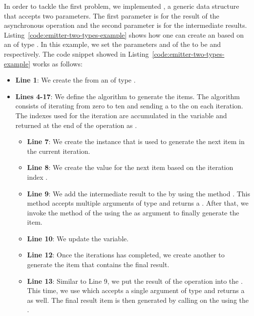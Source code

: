 \documentclass[type=bsc,accentcolor=tud9c]{tudthesis}
\begin{document}
In order to tackle the first problem, we implemented , a generic data structure that accepts two parameters. The first parameter  is for the result of the asynchronous operation and the second parameter  is for the intermediate results. Listing~\ref{code:emitter-two-types-example} shows how one can create an  based on an  of type . In this example, we set the parameters  and  of the  to be  and  respectively. The code snippet showed in Listing~\ref{code:emitter-two-types-example} works as follows:
\begin{itemize}
	\item {\bf Line 1}: We create the  from an  of type .
	\item {\bf Lines 4-17}: We define the algorithm to generate the items. The algorithm consists of iterating from zero to ten and sending a  to the  on each iteration. The indexes  used for the iteration are accumulated in the variable  and returned at the end of the operation as .
	\begin{itemize}
		\item {\bf Line 7}: We create the  instance that is used to generate the next item in the current iteration.
		\item {\bf Line 8}: We create the  value for the next item based on the iteration index .
		\item {\bf Line 9}: We add the intermediate result  to the  by using the method . This method accepts multiple arguments of type  and returns a . After that, we invoke the  method of the  using the  as argument to finally generate the item.
		\item {\bf Line 10}: We update the  variable.
		\item {\bf Line 12}: Once the iterations has completed, we create another  to generate the item that contains the final result.
		\item {\bf Line 13}: Similar to Line 9, we put the result of the operation into the . This time, we use  which accepts a single argument of type  and returns a  as well. The final result item is then generated by calling  on the  using the .

\end{itemize}
\end{itemize}
\end{document}
